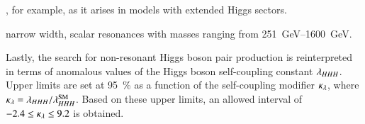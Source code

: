 , for example, as it arises in models with extended Higgs sectors.

narrow width, scalar resonances with masses ranging from
\SIrange{251}{1600}{\GeV}.



Lastly, the search for non-resonant Higgs boson pair production is reinterpreted
in terms of anomalous values of the Higgs boson self-coupling constant
$\lambda_{HHH}$. Upper limits are set at \SI{95}{\percent} as a function of the
self-coupling modifier $\kappa_{\lambda}$, where
$\kappa_{\lambda} = \lambda_{HHH} / \lambda_{HHH}^{\text{SM}}$. Based on these upper limits,
an allowed \klambda interval of $\num{-2.4} \leq \kappa_{\lambda} \leq 9.2$ is obtained.






%


%


